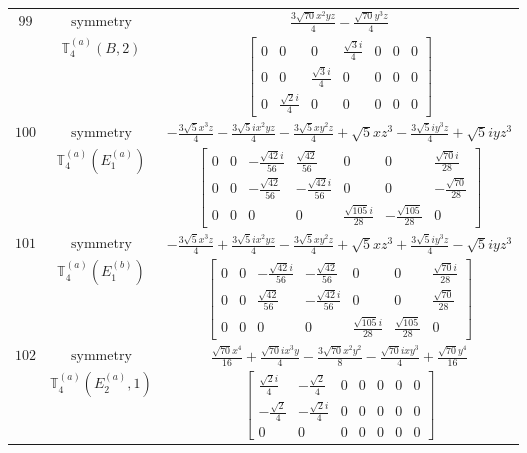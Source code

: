 \documentclass[fleqn,8pt,landscape]{jsarticle}
\begin{document}
\begin{longtable}{ccc}
$ 99 $ & $ \text{symmetry} $ & $ \frac{3 \sqrt{70} x^{2} y z}{4} - \frac{\sqrt{70} y^{3} z}{4} $ \\
$  $ & $ \mathbb{T}_{4}^{(a)}(B,2) $ & $ \begin{bmatrix} 0 & 0 & 0 & \frac{\sqrt{3} i}{4} & 0 & 0 & 0 \\ 0 & 0 & \frac{\sqrt{3} i}{4} & 0 & 0 & 0 & 0 \\ 0 & \frac{\sqrt{2} i}{4} & 0 & 0 & 0 & 0 & 0 \end{bmatrix} $ \\ \hline
$ 100 $ & $ \text{symmetry} $ & $ - \frac{3 \sqrt{5} x^{3} z}{4} - \frac{3 \sqrt{5} i x^{2} y z}{4} - \frac{3 \sqrt{5} x y^{2} z}{4} + \sqrt{5} x z^{3} - \frac{3 \sqrt{5} i y^{3} z}{4} + \sqrt{5} i y z^{3} $ \\
$  $ & $ \mathbb{T}_{4}^{(a)}(E_{1}^{(a)}) $ & $ \begin{bmatrix} 0 & 0 & - \frac{\sqrt{42} i}{56} & \frac{\sqrt{42}}{56} & 0 & 0 & \frac{\sqrt{70} i}{28} \\ 0 & 0 & - \frac{\sqrt{42}}{56} & - \frac{\sqrt{42} i}{56} & 0 & 0 & - \frac{\sqrt{70}}{28} \\ 0 & 0 & 0 & 0 & \frac{\sqrt{105} i}{28} & - \frac{\sqrt{105}}{28} & 0 \end{bmatrix} $ \\ \hline
$ 101 $ & $ \text{symmetry} $ & $ - \frac{3 \sqrt{5} x^{3} z}{4} + \frac{3 \sqrt{5} i x^{2} y z}{4} - \frac{3 \sqrt{5} x y^{2} z}{4} + \sqrt{5} x z^{3} + \frac{3 \sqrt{5} i y^{3} z}{4} - \sqrt{5} i y z^{3} $ \\
$  $ & $ \mathbb{T}_{4}^{(a)}(E_{1}^{(b)}) $ & $ \begin{bmatrix} 0 & 0 & - \frac{\sqrt{42} i}{56} & - \frac{\sqrt{42}}{56} & 0 & 0 & \frac{\sqrt{70} i}{28} \\ 0 & 0 & \frac{\sqrt{42}}{56} & - \frac{\sqrt{42} i}{56} & 0 & 0 & \frac{\sqrt{70}}{28} \\ 0 & 0 & 0 & 0 & \frac{\sqrt{105} i}{28} & \frac{\sqrt{105}}{28} & 0 \end{bmatrix} $ \\ \hline
$ 102 $ & $ \text{symmetry} $ & $ \frac{\sqrt{70} x^{4}}{16} + \frac{\sqrt{70} i x^{3} y}{4} - \frac{3 \sqrt{70} x^{2} y^{2}}{8} - \frac{\sqrt{70} i x y^{3}}{4} + \frac{\sqrt{70} y^{4}}{16} $ \\
$  $ & $ \mathbb{T}_{4}^{(a)}(E_{2}^{(a)},1) $ & $ \begin{bmatrix} \frac{\sqrt{2} i}{4} & - \frac{\sqrt{2}}{4} & 0 & 0 & 0 & 0 & 0 \\ - \frac{\sqrt{2}}{4} & - \frac{\sqrt{2} i}{4} & 0 & 0 & 0 & 0 & 0 \\ 0 & 0 & 0 & 0 & 0 & 0 & 0 \end{bmatrix} $ \\ \hline

\end{longtable}
\end{document}
